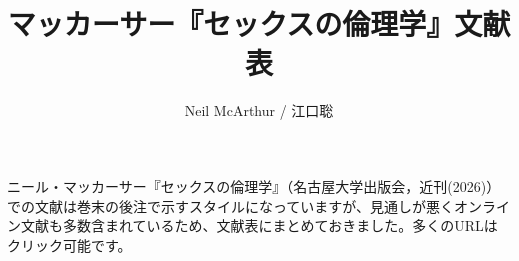 \documentclass[]{jlreq} \usepackage{mystyle}
\title{マッカーサー『セックスの倫理学』文献表}
\author{Neil McArthur / 江口聡}
\begin{document}
\maketitle

ニール・マッカーサー『セックスの倫理学』（名古屋大学出版会，近刊(2026)）での文献は巻末の後注で示すスタイルになっていますが、見通しが悪くオンライン文献も多数含まれているため、文献表にまとめておきました。多くのURLはクリック可能です。




%
%

\ifx\undefined\bysame
\newcommand{\bysame}{\hskip.3em \leavevmode\rule[.5ex]{2.5em}{.3pt}\hskip0.5em}
\fi

\ifx\undefined\bysamejp
\newcommand{\bysamejp}{\hskip.2em
  \leavevmode\rule[.7ex]{2.5em}{.3pt}\hskip0.3em}
\fi
\end{document}
